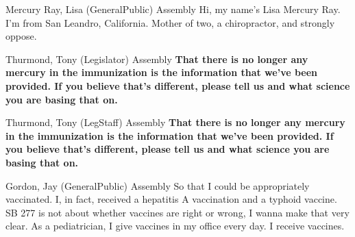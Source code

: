 \begin{result}{7.018925291222924}{Mercury Ray, Lisa (GeneralPublic) Assembly}
Hi, my name's Lisa Mercury Ray. I'm from San Leandro, California. Mother of two, a chiropractor, and strongly oppose.
\end{result}

\begin{result}{6.689088671002102}{Thurmond, Tony (Legislator) Assembly}
\textbf{That there is no longer any mercury in the immunization is the information that we've been provided. If you believe that's different, please tell us and what science you are basing that on.
}\end{result}

\begin{result}{6.689088671002102}{Thurmond, Tony (LegStaff) Assembly}
\textbf{That there is no longer any mercury in the immunization is the information that we've been provided. If you believe that's different, please tell us and what science you are basing that on.
}\end{result}

\begin{result}{3.093778771755809}{Gordon, Jay (GeneralPublic) Assembly}
So that I could be appropriately vaccinated. I, in fact, received a hepatitis A vaccination and a typhoid vaccine. SB 277 is not about whether vaccines are right or wrong, I wanna make that very clear. As a pediatrician, I give vaccines in my office every day. I receive vaccines.
\end{result}

